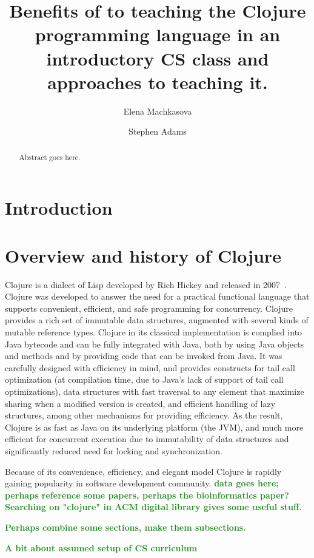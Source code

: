 \documentclass[submission,copyright,creativecommons]{eptcs}
\title{Benefits of to teaching the Clojure programming language in an introductory CS class and approaches to teaching it.}
\author{Elena Machkasova 
\institute{University of Minnesota, Morris\\
\email{elenam@morris.umn.edu}}
\and
Stephen Adams 
\institute{???}
\email{\quad tba@tba}
}
\newcommand{\allcomments}[1]{{#1}}
\newcommand{\elenacomment}[1]{{\bf \textcolor{ForestGreen}{\allcomments{{#1}}}}}
\begin{document}
\maketitle

\begin{abstract}
Abstract goes here.
\end{abstract}

\section{Introduction}

\section{Overview and history of Clojure}
Clojure  is a dialect of Lisp developed by Rich Hickey and released in 2007~\cite{Hickey:2008}. Clojure was developed to answer the need for a practical  functional language that supports convenient, efficient, and safe programming for concurrency. Clojure provides a rich set of immutable data structures, augmented with several kinds of mutable reference types. Clojure in its classical implementation is complied into Java bytecode and can be fully integrated with Java, both by using Java objects and methods and by providing code that can be invoked from Java. It was carefully designed with efficiency in mind, and provides constructs for tail call optimization (at compilation time, due to Java's lack of support of tail call optimizations), data structures with fast traversal to any element that maximize sharing when a modified version is created, and efficient handling of lazy structures, among other mechanisms for providing efficiency. As the result, Clojure is as fast as Java on its underlying platform (the JVM), and much more efficient for concurrent execution due to immutability of data structures and significantly reduced need for locking and synchronization. 

Because of its convenience, efficiency, and elegant model Clojure is rapidly gaining popularity in software development community. \elenacomment{data goes here; perhaps reference some papers, perhaps the bioinformatics paper? Searching on "clojure" in ACM digital library gives some useful stuff.}

\elenacomment{Perhaps combine some sections, make them subsections.}

\elenacomment{A bit about assumed setup of CS curriculum}
\end{document}
